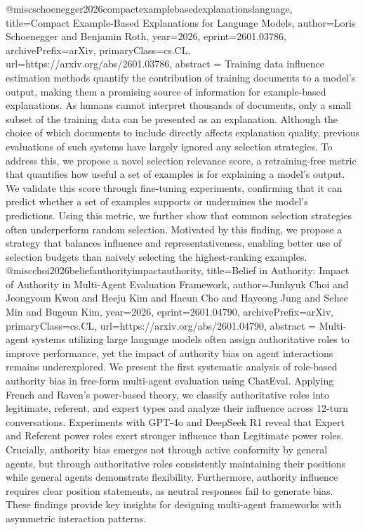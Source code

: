 {}@misc{schoenegger2026compactexamplebasedexplanationslanguage,
      title={Compact Example-Based Explanations for Language Models}, 
      author={Loris Schoenegger and Benjamin Roth},
      year={2026},
      eprint={2601.03786},
      archivePrefix={arXiv},
      primaryClass={cs.CL},
      url={https://arxiv.org/abs/2601.03786},
      abstract = {Training data influence estimation methods quantify the contribution of training documents to a model's output, making them a promising source of information for example-based explanations. As humans cannot interpret thousands of documents, only a small subset of the training data can be presented as an explanation. Although the choice of which documents to include directly affects explanation quality, previous evaluations of such systems have largely ignored any selection strategies. To address this, we propose a novel selection relevance score, a retraining-free metric that quantifies how useful a set of examples is for explaining a model's output. We validate this score through fine-tuning experiments, confirming that it can predict whether a set of examples supports or undermines the model's predictions. Using this metric, we further show that common selection strategies often underperform random selection. Motivated by this finding, we propose a strategy that balances influence and representativeness, enabling better use of selection budgets than naively selecting the highest-ranking examples.}
}@misc{choi2026beliefauthorityimpactauthority,
      title={Belief in Authority: Impact of Authority in Multi-Agent Evaluation Framework}, 
      author={Junhyuk Choi and Jeongyoun Kwon and Heeju Kim and Haeun Cho and Hayeong Jung and Sehee Min and Bugeun Kim},
      year={2026},
      eprint={2601.04790},
      archivePrefix={arXiv},
      primaryClass={cs.CL},
      url={https://arxiv.org/abs/2601.04790},
      abstract = {Multi-agent systems utilizing large language models often assign authoritative roles to improve performance, yet the impact of authority bias on agent interactions remains underexplored. We present the first systematic analysis of role-based authority bias in free-form multi-agent evaluation using ChatEval. Applying French and Raven's power-based theory, we classify authoritative roles into legitimate, referent, and expert types and analyze their influence across 12-turn conversations. Experiments with GPT-4o and DeepSeek R1 reveal that Expert and Referent power roles exert stronger influence than Legitimate power roles. Crucially, authority bias emerges not through active conformity by general agents, but through authoritative roles consistently maintaining their positions while general agents demonstrate flexibility. Furthermore, authority influence requires clear position statements, as neutral responses fail to generate bias. These findings provide key insights for designing multi-agent frameworks with asymmetric interaction patterns.}
}
